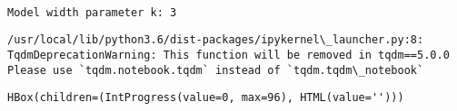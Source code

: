 \documentclass[11pt]{article}
\begin{document}
    \begin{Verbatim}[commandchars=\\\{\}]

Model width parameter k: 3
    \end{Verbatim}

    \begin{Verbatim}[commandchars=\\\{\}]
/usr/local/lib/python3.6/dist-packages/ipykernel\_launcher.py:8:
TqdmDeprecationWarning: This function will be removed in tqdm==5.0.0
Please use `tqdm.notebook.tqdm` instead of `tqdm.tqdm\_notebook`

    \end{Verbatim}

    
    \begin{verbatim}
HBox(children=(IntProgress(value=0, max=96), HTML(value='')))
    \end{verbatim}
\end{document}
